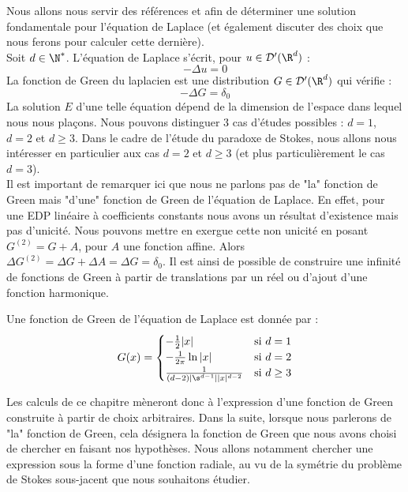 Nous allons nous servir des références \cite{Golse} et \cite{Evans} afin de déterminer une solution fondamentale pour l'équation de Laplace (et également discuter des choix que nous ferons pour calculer cette dernière).\\
Soit $d \in \N^*$.
L'équation de Laplace s'écrit, pour $u \in \mathcal{D}'(\R^d)$ :
$$- \Delta u = 0$$
La fonction de Green du laplacien est une distribution $G \in \mathcal{D}'(\R^d)$ qui vérifie :
$$- \Delta G = \delta_0$$
La solution $E$ d'une telle équation dépend de la dimension de l'espace dans lequel nous nous plaçons. Nous pouvons distinguer 3 cas d'études possibles : $d = 1$, $d= 2$ et $d \geq 3$.
Dans le cadre de l'étude du paradoxe de Stokes, nous allons nous intéresser en particulier aux cas $d = 2$ et $d \geq 3$ (et plus particulièrement
le cas $d =3$).\\
Il est important de remarquer ici que nous ne parlons pas de "la" fonction de Green mais "d'une" fonction de Green de l'équation de Laplace. En effet, pour une EDP linéaire à coefficients constants nous 
avons un résultat d'existence mais pas d'unicité. Nous pouvons mettre en exergue cette non unicité en posant $G^{(2)} = G + A $, pour $A$ une fonction affine. 
Alors $\Delta G^{(2)} = \Delta G + \Delta A = \Delta G = \delta_0$. Il est ainsi de possible de construire une infinité de fonctions de Green à partir de translations par un réel ou d'ajout d'une fonction harmonique.
\begin{theorembox}
    \begin{theorem}
        Une fonction de Green de l'équation de Laplace est donnée par :
        $$ G(x) = 
        \begin{cases}
            -\frac{1}{2}|x| \quad &\text{si } d = 1 \\
            -\frac{1}{2\pi} \ln|x| \quad &\text{si } d = 2 \\
            \frac{1}{(d-2) | \s^{d-1} | |x|^{d-2}} &\text{si } d \geq 3
        \end{cases} $$
    \end{theorem}
\end{theorembox}
Les calculs de ce chapitre mèneront donc à l'expression d'une fonction de Green construite à partir de choix arbitraires. Dans la suite, lorsque nous parlerons de "la" fonction de Green, cela désignera la fonction de Green que nous avons choisi de chercher en faisant nos hypothèses. Nous allons notamment chercher une expression sous la forme d'une fonction radiale, au vu de la symétrie du problème de Stokes sous-jacent que nous souhaitons étudier.
